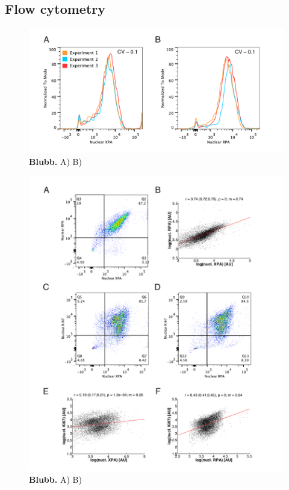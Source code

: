 
\subsection{Flow cytometry}
\begin{figure}[htbp]
	\begin{center}
		\includegraphics[width=1\textwidth]{Abbildungen/figure4_4.pdf}
		\caption{\textbf{Blubb.} A) B) }
		\label{fig:FC_proteindistribution}
	\end{center}
\end{figure}
\begin{figure}[htbp]
	\begin{center}
		\includegraphics[width=1\textwidth]{Abbildungen/figure4_5.pdf}
		\caption{\textbf{Blubb.} A) B) }
		\label{fig:FC_correlation}
	\end{center}
\end{figure}

